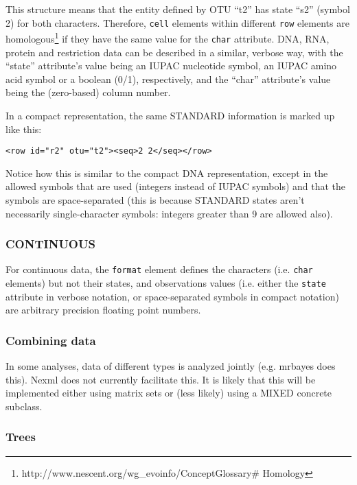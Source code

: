 \documentclass{article}
\newcommand{\code}{\texttt} \usepackage{fullpage}
\begin{document}
This structure means that the entity defined by OTU ``t2'' has state
``s2'' (symbol 2) for both characters. Therefore, \code{cell} elements
within different \code{row} elements are
homologous\footnote{http://www.nescent.org/wg\_evoinfo/ConceptGlossary\#
Homology} if they have the same value for the \code{char} attribute.
DNA, RNA, protein and restriction data can be described in a similar,
verbose way, with the ``state'' attribute's value being an IUPAC
nucleotide symbol, an IUPAC amino acid symbol or a boolean (0/1),
respectively, and the ``char'' attribute's value being the (zero-based)
column number.

In a compact representation, the same STANDARD information is marked up
like this: 
\begin{verbatim}<row id="r2" otu="t2"><seq>2 2</seq></row>\end{verbatim}

Notice how this is similar to the compact DNA representation, except in
the allowed symbols that are used (integers instead of IUPAC symbols)
and that the symbols are space-separated (this is because STANDARD
states aren't necessarily single-character symbols: integers greater
than 9 are allowed also).

\subsubsection{CONTINUOUS} For continuous data, the \code{format}
element defines the characters (i.e. \code{char} elements) but not their
states, and observations values (i.e. either the \code{state} attribute
in verbose notation, or space-separated symbols in compact notation) are
arbitrary precision floating point numbers.

\subsubsection{Combining data} In some analyses, data of different types
is analyzed jointly (e.g. mrbayes does this). Nexml does not currently
facilitate this. It is likely that this will be implemented either using
matrix sets or (less likely) using a MIXED concrete subclass.

\subsubsection{Trees} 
\end{document}
